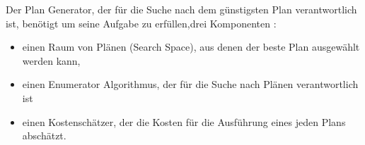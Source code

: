 Der Plan Generator, der für die Suche nach dem günstigsten Plan verantwortlich ist, benötigt um seine Aufgabe zu erfüllen,drei Komponenten \cite{chaudhuri1998overview}: 

\begin{itemize}
\item einen Raum von Plänen (Search Space), aus denen der beste Plan ausgewählt werden kann,
\item einen Enumerator Algorithmus, der für die Suche nach Plänen verantwortlich ist
\item einen Kostenschätzer, der die Kosten für die Ausführung eines jeden Plans abschätzt.
\end{itemize}
